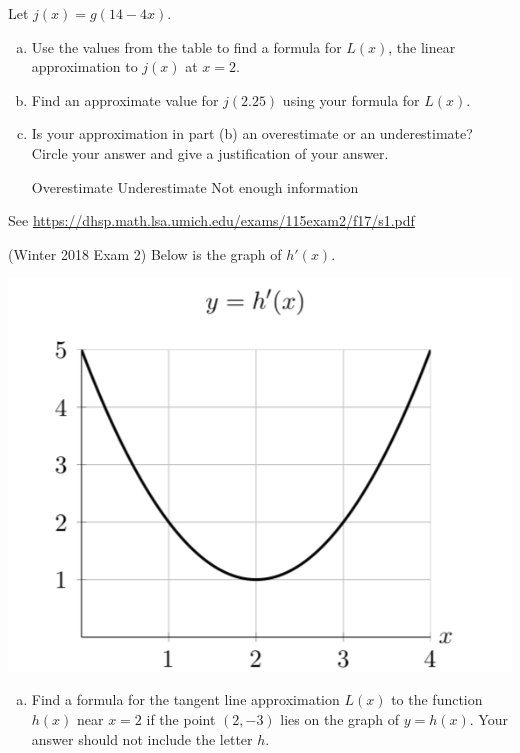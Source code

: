 \documentclass[11pt]{exam}
\begin{document}
\begin{questions}
\begin{center}
        \end{center}
Let $j(x) = g(14-4x)$.
\begin{enumerate}[(a)]
\item Use the values from the table to find a formula for $L(x)$, the linear approximation to $j(x)$ at $x = 2$.
\vspace{0.2in}
\item Find an approximate value for $j(2.25)$ using your formula for $L(x)$.
\vspace{0.2in}
\item Is your approximation in part (b) an overestimate or an underestimate? Circle your answer and give a justification of your answer.

\centering Overestimate \hspace{7mm} Underestimate \hspace{7mm} Not enough information 
\vspace{0.2in}
\end{enumerate}
\begin{solution}
  See \href{https://dhsp.math.lsa.umich.edu/exams/115exam2/f17/s1.pdf}{https://dhsp.math.lsa.umich.edu/exams/115exam2/f17/s1.pdf}
\end{solution}
\question (Winter 2018 Exam 2) %
Below is the graph of $h'(x)$.
\begin{center}
  \includegraphics[scale=0.4]{Figures/Exam2W2018Problem9}
\end{center}
\begin{enumerate}[(a)]
\item Find a formula for the tangent line approximation $L(x)$ to the function $h(x)$ near $x = 2$ if the point $(2,-3)$ lies on the graph of $y = h(x)$. Your answer should not include the letter $h$.

\end{enumerate}
\end{questions}
\end{document}
